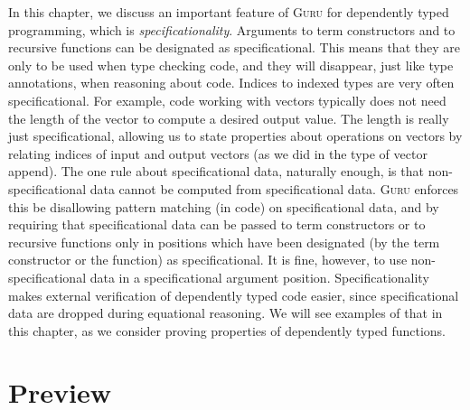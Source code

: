 \documentclass{book}[12pt]
\newcommand{\guru}[0]{\textsc{Guru}\xspace}
\begin{document}
In this chapter, we discuss an important feature of \guru for
dependently typed programming, which is \emph{specificationality}.
Arguments to term constructors and to recursive functions can be
designated as specificational.  This means that they are only to be
used when type checking code, and they will disappear, just like type
annotations, when reasoning about code.  Indices to indexed types are
very often specificational.  For example, code working with vectors
typically does not need the length of the vector to compute a desired
output value.  The length is really just specificational, allowing us
to state properties about operations on vectors by relating indices of
input and output vectors (as we did in the type of vector append).
The one rule about specificational data, naturally enough, is that
non-specificational data cannot be computed from specificational data.
\guru enforces this be disallowing pattern matching (in code) on
specificational data, and by requiring that specificational data can
be passed to term constructors or to recursive functions only in
positions which have been designated (by the term constructor or the
function) as specificational.  It is fine, however, to use
non-specificational data in a specificational argument position.
Specificationality makes external verification of dependently typed
code easier, since specificational data are dropped during equational
reasoning.  We will see examples of that in this chapter, as we
consider proving properties of dependently typed functions.

\section{Preview}
\end{document}
